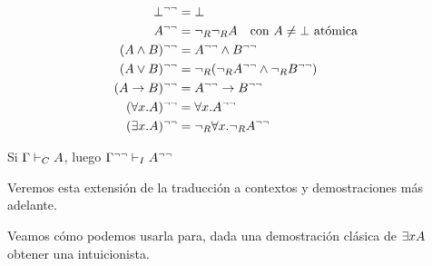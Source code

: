 \begin{definition}
    \begin{align*}
        \bot^{\neg\neg} &= \bot\\
        A^{\neg\neg} &= \neg_R\neg_R A \quad \text{con $A \neq \bot$ atómica}\\
        (A \wedge B)^{\neg\neg} &= A^{\neg\neg} \wedge B^{\neg\neg}\\
        (A \vee B)^{\neg\neg} &= \neg_R(\neg_RA^{\neg\neg} \wedge \neg_RB^{\neg\neg})\\
        (A \rightarrow B)^{\neg\neg} &= A^{\neg\neg} \rightarrow B^{\neg\neg}\\
        (\forall x . A)^{\neg\neg} &= \forall x . A^{\neg\neg}\\
        (\exists x . A)^{\neg\neg} &= \neg_R \forall x . \neg_R A^{\neg\neg}
    \end{align*}
\end{definition}

\begin{theorem}
    Si $\Gamma \vdash_C A$, luego $\Gamma^{\neg\neg} \vdash_I A^{\neg\neg}$

    Veremos esta extensión de la traducción a contextos y demostraciones más adelante.
\end{theorem}

Veamos cómo podemos usarla para, dada una demostración clásica de $\exists x
A$ obtener una intuicionista.


